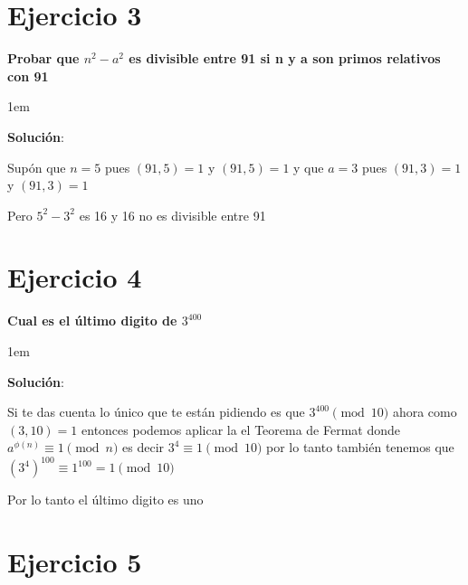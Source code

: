 \documentclass[12pt, fleqn]{article}                             %
\newenvironment{SmallIndentation}[1][0.75em]                    %
    {\begin{adjustwidth}{#1}{}\begin{footnotesize}}                 %
    {\end{footnotesize}\end{adjustwidth}}                           %
\begin{document}
\section{Ejercicio 3}

    \textbf{Probar que $n^2 - a^2$ es divisible entre 91 si n y a son primos relativos con 91}

    \begin{SmallIndentation}[1em]
        \textbf{Solución}:
        
        Supón que $n = 5$ pues $(91, 5) = 1$ y $(91, 5) = 1$
        y que $a = 3$ pues $(91, 3) = 1$ y $(91, 3) = 1$

        Pero $5^2- 3^2$ es 16 y 16 no es divisible entre 91 
    
    \end{SmallIndentation}
        



\section{Ejercicio 4}

    \textbf{Cual es el último digito de $3^{400}$}

    \begin{SmallIndentation}[1em]
        \textbf{Solución}:
        
        Si te das cuenta lo único que te están pidiendo es que $3^{400} \pmod{10}$
        ahora como $(3, 10) = 1$ entonces podemos aplicar la el Teorema de Fermat
        donde $a^{\phi(n)} \equiv 1 \pmod{n}$ es decir $3^{4} \equiv 1 \pmod{10}$
        por lo tanto también tenemos que $(3^{4})^{100} \equiv 1^{100} = 1 \pmod{10}$

        Por lo tanto el último digito es uno
    
    \end{SmallIndentation}



\section{Ejercicio 5}
\end{document}
